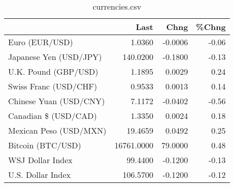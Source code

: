 \documentclass{article}%
\begin{document}
%


\begin{table}[htbp]%
\caption{currencies.csv}%
\centering%
\begin{adjustbox}{width=1\textwidth}%
\begin{tabular}{lrrr}
\toprule
                       &       Last &    Chng &  \%Chng \\
\midrule
        Euro (EUR/USD) &     1.0360 & -0.0006 &  -0.06 \\
Japanese Yen (USD/JPY) &   140.0200 & -0.1800 &  -0.13 \\
  U.K. Pound (GBP/USD) &     1.1895 &  0.0029 &   0.24 \\
 Swiss Franc (USD/CHF) &     0.9533 &  0.0013 &   0.14 \\
Chinese Yuan (USD/CNY) &     7.1172 & -0.0402 &  -0.56 \\
  Canadian \$ (USD/CAD) &     1.3350 &  0.0024 &   0.18 \\
Mexican Peso (USD/MXN) &    19.4659 &  0.0492 &   0.25 \\
     Bitcoin (BTC/USD) & 16761.0000 & 79.0000 &   0.48 \\
      WSJ Dollar Index &    99.4400 & -0.1200 &  -0.13 \\
     U.S. Dollar Index &   106.5700 & -0.1200 &  -0.12 \\
\bottomrule
\end{tabular}
%
\end{adjustbox}%
\end{table}

%
\end{document}
